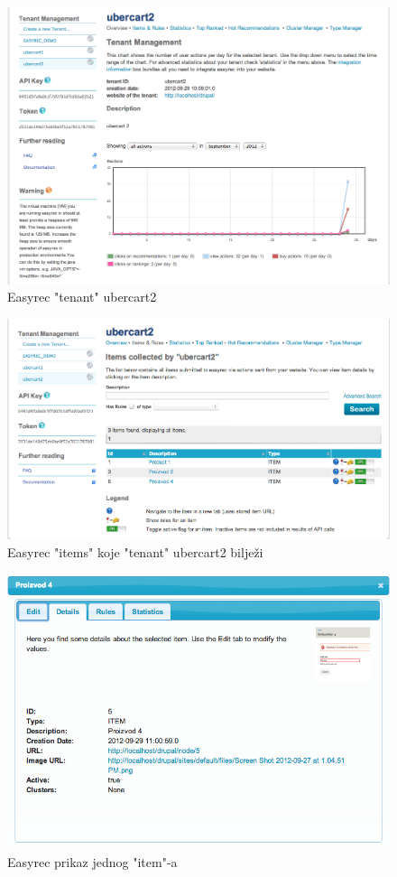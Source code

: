 \documentclass[times, utf8, seminar]{fit}
\begin{document}
{{{\begin{figure}[H]
\centering
\includegraphics[width=12cm]{img/easyrec_1_tenant.png}
\caption{Easyrec "tenant" ubercart2}
\end{figure}

\begin{figure}[H]
\centering
\includegraphics[width=12cm]{img/easyrec_2_item.png}
\caption{Easyrec "items" koje "tenant" ubercart2 bilježi}
\end{figure}


\begin{figure}[H]
\centering
\includegraphics[width=12cm]{img/easyrec_3_item.png}
\caption{Easyrec prikaz jednog "item"-a}
\end{figure}

}}}
\end{document}

